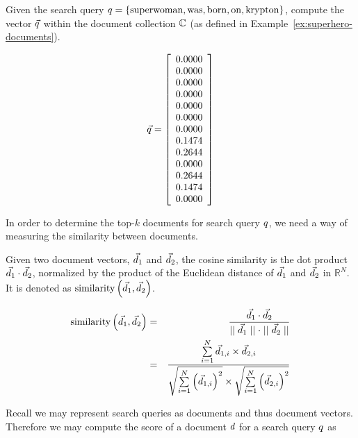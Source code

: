 		\begin{ex}
			Given the search query $q = \left\{\mathrm{superwoman}, \mathrm{was}, \mathrm{born}, \mathrm{on}, \mathrm{krypton}\right\}$, compute the vector $\vec{q}$ within the document collection $\mathbb{C}$ (as defined in Example~\ref{ex:superhero-documents}).
			
			$$
			\vec{q} = 
				\left[
					\begin{array}{c}
						0.0000 \\
						0.0000 \\
						0.0000 \\
						0.0000 \\
						0.0000 \\
						0.0000 \\
						0.0000 \\
						0.1474 \\
						0.2644 \\
						0.0000 \\
						0.2644 \\
						0.1474 \\
						0.0000 \\
					\end{array}
				\right]
			$$
		\end{ex}
		
		In order to determine the top-$k$ documents for search query $q$, we need a way of measuring the similarity between documents.
		
		\begin{defn}
			Given two document vectors, $\vec{d}_1$ and $\vec{d}_2$, the cosine similarity is the dot product $\vec{d}_1 \cdot \vec{d}_2$, normalized by the product of the Euclidean distance of $\vec{d}_1$ and $\vec{d}_2$ in $\mathbb{R}^N$.  It is denoted as $\operatorname{similarity}\left(\vec{d}_1, \vec{d}_2\right)$.
			
			\begin{eqnarray}
				\operatorname{similarity}\left(\vec{d}_1, \vec{d}_2\right) &=& \frac{\vec{d}_1 \cdot \vec{d}_2}{\mid\mid \vec{d}_1 \mid\mid \cdot \mid\mid \vec{d}_2 \mid\mid} \\
				 &=& \frac{\sum\limits_{i=1}^{N} \vec{d}_{1, i} \times \vec{d}_{2, i}}{\sqrt{\sum\limits_{i=1}^{N} \left(\vec{d}_{1, i}\right)^2} \times \sqrt{\sum\limits_{i=1}^{N} \left(\vec{d}_{2, i}\right)^2}}
			\end{eqnarray}
		\end{defn}
		
		Recall we may represent search queries as documents and thus document vectors.  Therefore we may compute the score of a document $d$ for a search query $q$ as
		
